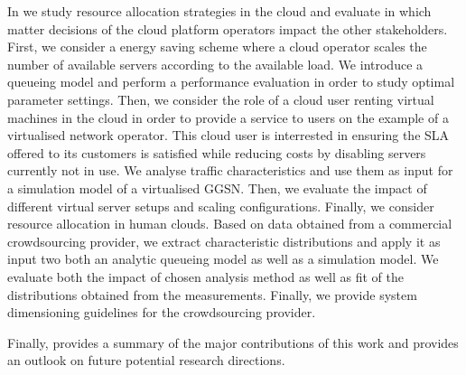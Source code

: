 In  we study resource allocation strategies in the cloud and evaluate in which matter decisions of the cloud platform operators impact the other stakeholders.
First, we consider a energy saving scheme where a cloud operator scales the number of available servers according to the available load.
We introduce a queueing model and perform a performance evaluation in order to study optimal parameter settings.
Then, we consider the role of a cloud user renting virtual machines in the cloud in order to provide a service to users on the example of a virtualised network operator.
This cloud user is interrested in ensuring the \gls{SLA} offered to its customers is satisfied while reducing costs by disabling servers currently not in use.
We analyse traffic characteristics and use them as input for a simulation model of a virtualised \gls{GGSN}.
Then, we evaluate the impact of different virtual server setups and scaling configurations.
Finally, we consider resource allocation in human clouds.
Based on data obtained from a commercial crowdsourcing provider, we extract characteristic distributions and apply it as input two both an analytic queueing model as well as a simulation model.
We evaluate both the impact of chosen analysis method as well as fit of the distributions obtained from the measurements.
Finally, we provide system dimensioning guidelines for the crowdsourcing provider.

Finally,  provides a summary of the major contributions of this work and provides an outlook on future potential research directions.